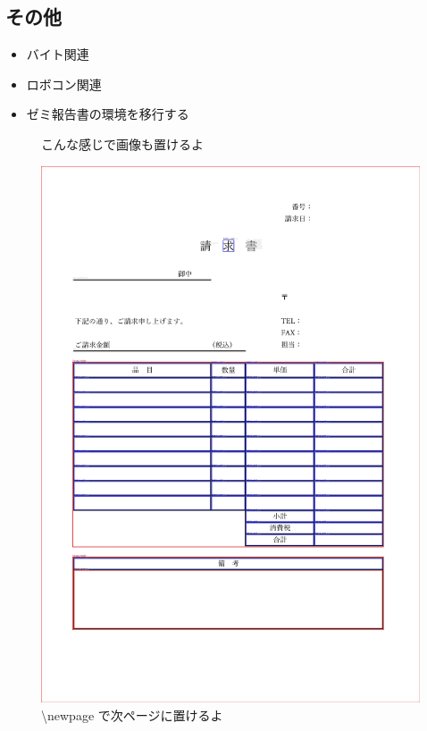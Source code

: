 \documentclass[uplatex, onecolumn, 10pt]{jsarticle}
\begin{document}
\subsection*{その他}
\begin{itemize}
	\item バイト関連
	\item ロボコン関連
	\item ゼミ報告書の環境を移行する
\end{itemize}

\newpage

\begin{figure}[t]
    \begin{center}
            \caption{こんな感じで画像も置けるよ}
    \end{center}
\end{figure}

\begin{figure}[t]
    \begin{center}
        \includegraphics[keepaspectratio,width=0.4\linewidth]{image/seikyuu_rectangles.jpg}
        \caption{\textbackslash newpage で次ページに置けるよ}
    \end{center}
\end{figure}
\end{document}

